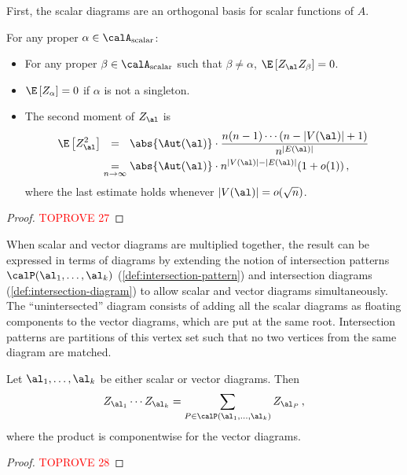 \documentclass[12pt]{article}
\newcommand{\scalar}{\textnormal{scalar}}
\begin{document}
    First, the scalar diagrams are an orthogonal basis for scalar functions of $A$.
    \begin{lemma}
        For any proper $\alpha\in\calA_{\scalar}$:
        \begin{itemize}
            \item For any proper $\beta\in\calA_{\scalar}$ such that $\beta\neq \alpha$, $\E\left[Z_\al Z_\beta\right] = 0$.
            \item $\E \left[Z_\alpha\right]=0$ if $\alpha$ is not a singleton.
            \item The second moment of $Z_\al$ is
            \begin{align*}
                \E\left[Z_\al^2\right] &\underset{\phantom{n\to\infty}}{=} \abs{\Aut(\al)} \cdot \frac{n(n-1)\cdots(n-|V(\al)|+1)}{n^{|E(\al)|}} \\
                &\underset{n\to\infty}{=} \abs{\Aut(\al)} \cdot n^{|V(\al)|-|E(\al)|}(1+o(1))\,,
            \end{align*}
            where the last estimate holds whenever $|V(\al)|=o(\sqrt n)$.
        \end{itemize}
    \end{lemma}
    \begin{proof}\textcolor{red}{TOPROVE 27}\end{proof}
    

    When scalar and vector diagrams are multiplied together, the result can be expressed in terms of diagrams by extending the notion of intersection patterns $\calP(\al_1, \dots, \al_k)$ (\cref{def:intersection-pattern}) and intersection diagrams (\cref{def:intersection-diagram})
    to allow scalar and vector diagrams simultaneously. The ``unintersected'' diagram
    consists of adding all the scalar diagrams as floating components to the vector diagrams, which are put at the same root.
    Intersection patterns are partitions of this vertex set
    such that no two vertices from the same diagram are matched.
    \begin{lemma}\label{lem:scalar-product}
        Let $\al_1, \dots, \al_k$ be either scalar or vector diagrams.
        Then \[
        Z_{\al_1}\cdots Z_{\al_k}  = \sum_{P \in \calP(\al_1,\dots, \al_k)} Z_{\al_P}\,,\]
        where the product is componentwise for the vector diagrams.
    \end{lemma}
    \begin{proof}\textcolor{red}{TOPROVE 28}\end{proof}
\end{document}
